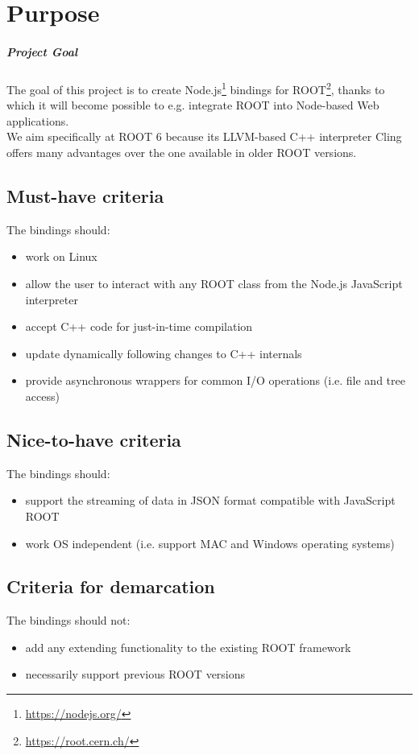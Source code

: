 \chapter{Purpose}
\paragraph{Project Goal}
The goal of this project is to create Node.js\textsuperscript{\textregistered}\footnote{\url{https://nodejs.org/}} bindings for 
ROOT\footnote{\url{https://root.cern.ch/}}, thanks to which it will become possible to e.g. integrate ROOT into Node-based Web applications.\\
We aim specifically at ROOT 6 because its LLVM-based C++ interpreter Cling offers many advantages over the one available in older ROOT versions.
\section{Must-have criteria}
The bindings should:
\begin{itemize}
	\item work on Linux
	\item allow the user to interact with any ROOT class from the Node.js JavaScript interpreter
	\item accept C++ code for just-in-time compilation
	\item update dynamically following changes to C++ internals
	\item provide asynchronous wrappers for common I/O operations (i.e. file and tree access)
\end{itemize}
\pagebreak[3]

\section{Nice-to-have criteria}
The bindings should:
\begin{itemize}
	\item support the streaming of data in JSON format compatible with JavaScript ROOT
	\item work OS independent (i.e. support MAC and Windows operating systems)
\end{itemize}

\section{Criteria for demarcation}
The bindings should not:
\begin{itemize}
	\item add any extending functionality to the existing ROOT framework
	\item necessarily support previous ROOT versions
\end{itemize}

